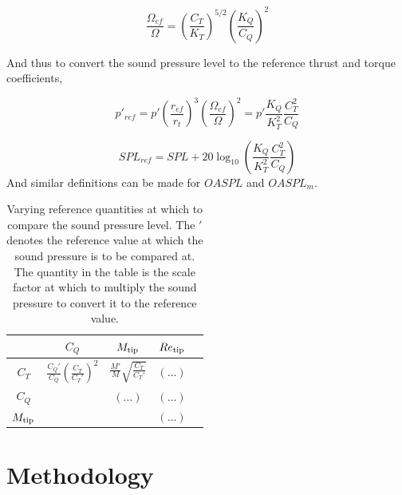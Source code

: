 \documentclass[12pt,a4paper]{article}
\begin{document}
\begin{equation}
    \frac{\Omega_{ef}}{\Omega} = \left(\frac{C_T}{K_T}\right)^{5/2} \left( \frac{K_Q}{C_Q} \right)^2
\end{equation}

And thus to convert the sound pressure level to the reference thrust and torque coefficients,

\begin{equation}
    p'_{ref} = p' \left(\frac{r_{ef}}{r_t}\right)^3 \left( \frac{\Omega_{ef}}{\Omega}\right)^2 = p' \frac{K_Q}{K_T^2} \frac{C_T^2}{C_Q} 
\end{equation}

\begin{equation}
    SPL_{ref} = SPL + 20 \log_{10} \left( \frac{K_Q}{K_T^2} \frac{C_T^2}{C_Q}  \right)
\end{equation}
And similar definitions can be made for $OASPL$ and $OASPL_m$.

\begin{table}[H]
    \centering
    \begin{tabular}{|c|c|c|c|c|}
      \hline
      & $C_Q$ & $M_{\rm tip}$ & $Re_{\rm tip}$ \\ 
      \hline
      $C_T$              & $\frac{C_Q'}{C_Q}\left(\frac{C_T}{C_T'}\right)^2$ & $ \frac{M'}{M}\sqrt{\frac{C_T}{C_T'}} $ & $\displaystyle(\dots)$ \\[6pt]
      $C_Q$              &      & $\displaystyle(\dots)$ & $\displaystyle(\dots)$ \\[6pt]
      $M_{\rm tip}$      &      &      & $\displaystyle(\dots)$ \\[6pt]
      \hline
    \end{tabular}
    \caption{Varying reference quantities at which to compare the sound pressure level. The $'$ denotes the reference value at which the sound pressure is to be compared at. The quantity in the table is the scale factor at which to multiply the sound pressure to convert it to the reference value.}
  \end{table}

\section{Methodology}

\end{document}
